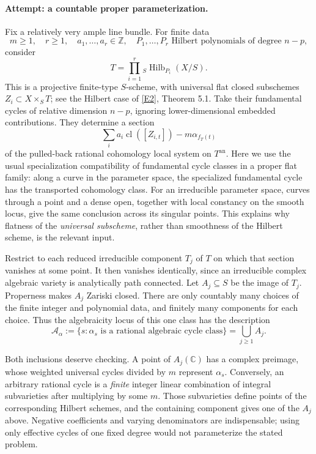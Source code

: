 \documentclass[11pt,a4paper]{article}
\newcommand{\Z}{\mathbb{Z}}
\newcommand{\C}{\mathbb{C}}
\newcommand{\eref}[2]{\hyperlink{extra:#1:#2}{[E#2]}}
\numberwithin{equation}{section}
\begin{document}
\paragraph{Attempt: a countable proper parameterization.}
Fix a relatively very ample line bundle. For finite data
\[
 m\ge1,\quad r\ge1,\quad a_1,\ldots,a_r\in\Z,
 \quad P_1,\ldots,P_r\text{ Hilbert polynomials of degree }n-p,
\]
consider
\begin{equation}\label{eq157-hilbert}
 T=\prod_{i=1}^r{}_S\operatorname{Hilb}_{P_i}(X/S).
\end{equation}
This is a projective finite-type $S$-scheme, with universal flat closed
subschemes $Z_i\subset X\times_ST$; see the Hilbert case of
\eref{30006758}{2}, Theorem 5.1. Take their fundamental cycles of relative
dimension $n-p$, ignoring lower-dimensional embedded contributions.
They determine a section
\[
 \sum_i a_i\operatorname{cl}([Z_{i,t}])-m\alpha_{f_T(t)}
\]
of the pulled-back rational cohomology local system on $T^{\mathrm{an}}$.
Here we use the usual specialization compatibility of fundamental cycle
classes in a proper flat family: along a curve in the parameter space,
the specialized fundamental cycle has the transported cohomology class.
For an irreducible parameter space, curves through a point and a dense
open, together with local constancy on the smooth locus, give the same
conclusion across its singular points. This explains why flatness of the
\emph{universal subscheme}, rather than smoothness of the Hilbert scheme,
is the relevant input.

Restrict to each reduced irreducible component $T_j$ of $T$ on which that
section vanishes at some point. It then vanishes identically, since an
irreducible complex algebraic variety is analytically path connected.
Let $A_j\subseteq S$ be the image of $T_j$. Properness makes $A_j$ Zariski
closed. There are only countably many choices of the finite integer and
polynomial data, and finitely many components for each choice. Thus the
algebraicity locus of this one class has the description
\begin{equation}\label{eq157-locus}
 \mathcal A_\alpha:=
 \{s:\alpha_s\text{ is a rational algebraic cycle class}\}
 =\bigcup_{j\ge1}A_j.
\end{equation}

Both inclusions deserve checking. A point of $A_j(\C)$ has a complex
preimage, whose weighted universal cycles divided by $m$ represent
$\alpha_s$. Conversely, an arbitrary rational cycle is a \emph{finite}
integer linear combination of integral subvarieties after multiplying by
some $m$. Those subvarieties define points of the corresponding Hilbert
schemes, and the containing component gives one of the $A_j$ above.
Negative coefficients and varying denominators are indispensable; using
only effective cycles of one fixed degree would not parameterize the
stated problem.
\end{document}
